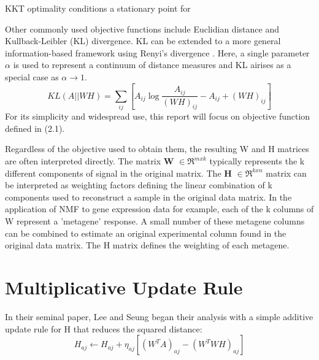 \documentclass[final,leqno,onefignum,onetabnum]{siamltex1213}
\begin{document}
KKT optimality conditions a stationary point for 




Other commonly used objective functions include Euclidian distance and Kullback-Leibler (KL) divergence. KL can be extended to a more general information-based framework using Renyi's divergence \cite{Dev1}. Here, a single parameter $\alpha$ is used to represent a continuum of distance measures and KL airises as a special case as $\alpha \to 1$. 
\begin{equation}\label{ObjKL}
 KL(A || WH) = \sum_{ij}{[A_{ij} \log{ \frac{A_{ij}}{(WH)_{ij}} - A_{ij} + (WH)_{ij}} ]}
\end{equation}
For its simplicity and widespread use, this report will focus on objective function defined in (2.1). 

Regardless of the objective used to obtain them, the resulting W and H matrices are often interpreted directly. The matrix \textbf{W} $ \in \Re^{m x k}$ typically represents the k different components of signal in the original matrix. The \textbf{H} $ \in \Re^{k x n}$ matrix can be interpreted as weighting factors defining the linear combination of k components used to reconstruct a sample in the original data matrix. In the application of NMF to gene expression data for example, each of the k columns of W represent a 'metagene' response. A small number of these metagene columns can be combined to estimate an original experimental column found in the original data matrix. The H matrix defines the weighting of each metagene. 


\section{Multiplicative Update Rule} In their seminal paper, Lee and Seung began their analysis with a simple additive update rule for H that reduces the squared distance: 
\begin{equation}\label{au1}
 H_{aj} \leftarrow  H_{aj} + \eta_{aj} [ (W^T A)_{aj} - (W^T WH)_{aj}]
\end{equation}
\end{document}
